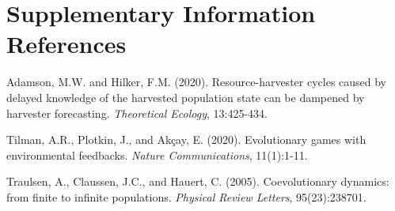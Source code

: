 \documentclass{article}
\begin{document}
\section*{Supplementary Information References}
\begin{description}
	\addtolength{\leftmargin}{0.2in}
	\setlength{\itemindent}{-0.2in}
	\item Adamson, M.W. and Hilker, F.M. (2020). Resource-harvester cycles caused by delayed knowledge of the harvested population state can be dampened by harvester forecasting. \textit{Theoretical Ecology}, 13:425-434.
	\item Tilman, A.R., Plotkin, J., and Ak\c{c}ay, E. (2020). Evolutionary games with environmental feedbacks. \textit{Nature Communications}, 11(1):1-11.
	\item Traulsen, A., Claussen, J.C., and Hauert, C. (2005). Coevolutionary dynamics: from finite to infinite populations. \textit{Physical Review Letters}, 95(23):238701.
\end{description}
\end{document}
